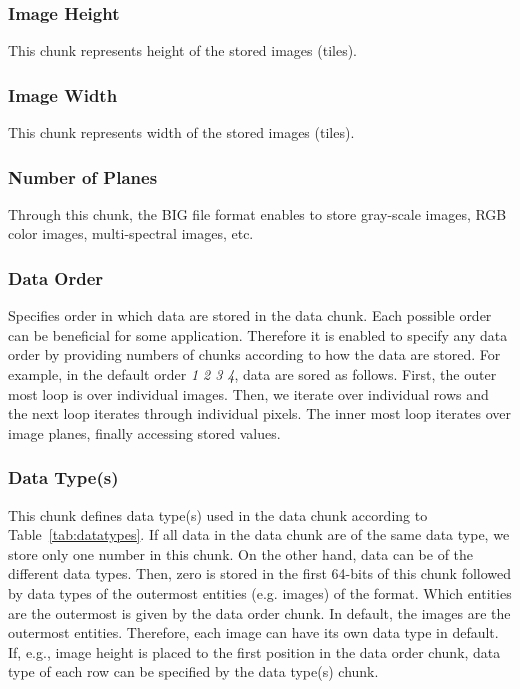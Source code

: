 \documentclass{article}
\begin{document}
\subsubsection{Image Height}
This chunk represents height of the stored images (tiles).

\subsubsection{Image Width}
This chunk represents width of the stored images (tiles).

\subsubsection{Number of Planes}
Through this chunk, the BIG file format enables to store gray-scale images, RGB color images, multi-spectral images, etc.

\subsubsection{Data Order}
Specifies order in which data are stored in the data chunk. Each possible order can be beneficial for some application. Therefore it is enabled to specify any data order by providing numbers of chunks according to how the data are stored. For example, in the default order \textit{1 2 3 4}, data are sored as follows. First, the outer most loop is over individual images. Then, we iterate over individual rows and the next loop iterates through individual pixels. The inner most loop iterates over image planes, finally accessing stored values.

\subsubsection{Data Type(s)}
This chunk defines data type(s) used in the data chunk according to Table~\ref{tab:datatypes}. If all data in the data chunk are of the same data type, we store only one number in this chunk. On the other hand, data can be of the different data types. Then, zero is stored in the first 64-bits of this chunk followed by data types of the outermost entities (e.g. images) of the format. Which entities are the outermost is given by the data order chunk. In default, the images are the outermost entities. Therefore, each image can have its own data type in default. If, e.g., image height is placed to the first position in the data order chunk, data type of each row can be specified by the data type(s) chunk.
\end{document}
